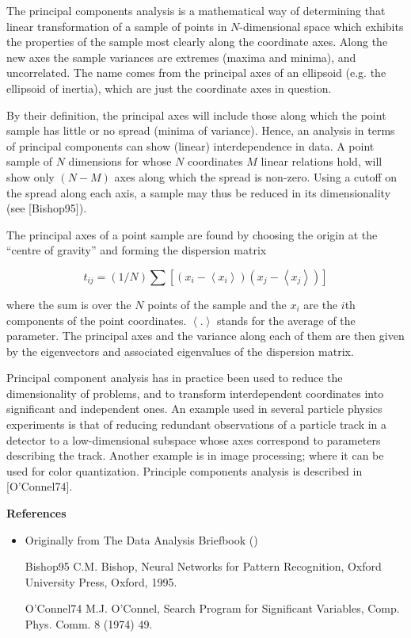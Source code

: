 \documentclass[12pt]{article}
\begin{document}
The principal components analysis is a mathematical way of determining that linear transformation of a sample of points in $N$-dimensional space which exhibits the properties of the sample most clearly along the coordinate axes. Along the new axes the sample variances are extremes (maxima and minima), and uncorrelated. The name comes from the principal axes of an ellipsoid (e.g. the ellipsoid of inertia), which are just the coordinate axes in question.

By their definition, the principal axes will include those along which the point sample has little or no spread (minima of variance). Hence, an analysis in terms of principal components can show (linear) interdependence in data. A point sample of $N$ dimensions for whose $N$ coordinates $M$ linear relations hold, will show only $(N-M)$ axes along which the spread is non-zero. Using a cutoff on the spread along each axis, a sample may thus be reduced in its dimensionality (see [Bishop95]).

The principal axes of a point sample are found by choosing the origin at the ``centre of gravity'' and forming the dispersion matrix

$$ t_{ij} = (1/N) \sum [(x_i-\left<x_i\right>)(x_j-\left<x_j\right>)] $$

where the sum is over the $N$ points of the sample and the $x_i$ are the $i$th components of the point coordinates. $\left<.\right>$ stands for the average of the parameter. The principal axes and the variance along each of them are then given by the eigenvectors and associated eigenvalues of the dispersion matrix.

Principal component analysis has in practice been used to reduce the dimensionality of problems, and to transform interdependent coordinates into significant and independent ones. An example used in several particle physics experiments is that of reducing redundant observations of a particle track in a detector to a low-dimensional subspace whose axes correspond to parameters describing the track. Another example is in image processing; where it can be used for color quantization. Principle components analysis is described in [O'Connel74].

{\bf References}

\begin{itemize}
\item Originally from The Data Analysis Briefbook
()
\end{itemize}

\begin{itemize}
\item[Bishop95]
C.M. Bishop, Neural Networks for Pattern Recognition, Oxford University Press, Oxford, 1995.
\item[O'Connel74]
M.J. O'Connel, Search Program for Significant Variables, Comp. Phys. Comm. 8 (1974) 49.
\end{itemize}
\end{document}
